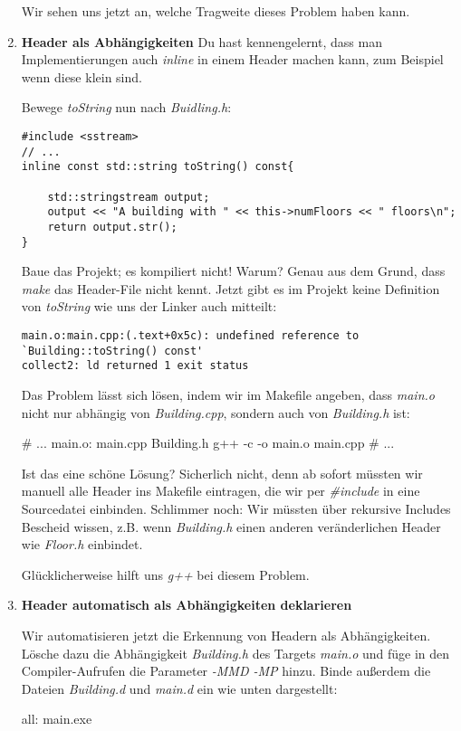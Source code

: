 \begin{enumerate}
Wir sehen uns jetzt an, welche Tragweite dieses Problem haben kann.


\item\textbf{Header als Abhängigkeiten}
Du hast kennengelernt, dass man Implementierungen auch \emph{inline} in einem Header machen kann, zum Beispiel wenn diese klein sind.

Bewege \emph{toString} nun nach \emph{Buidling.h}:
\begin{lstlisting}
#include <sstream>
// ...
inline const std::string toString() const{

    std::stringstream output;
    output << "A building with " << this->numFloors << " floors\n";
    return output.str();
}
\end{lstlisting}

Baue das Projekt; es kompiliert nicht! Warum? Genau aus dem Grund, dass \emph{make} das Header-File nicht \glqq kennt\grqq{}.
Jetzt gibt es im Projekt keine Definition von \emph{toString} wie uns der Linker auch mitteilt:
\begin{verbatim}
main.o:main.cpp:(.text+0x5c): undefined reference to `Building::toString() const'
collect2: ld returned 1 exit status
\end{verbatim}

Das Problem lässt sich lösen, indem wir im Makefile angeben, dass \emph{main.o} nicht nur abhängig von \emph{Building.cpp}, sondern auch von \emph{Building.h} ist:
\begin{lstmake}
# ...
main.o: main.cpp Building.h
	g++ -c -o main.o main.cpp
# ...
\end{lstmake}

Ist das eine schöne Lösung?
Sicherlich nicht, denn ab sofort müssten wir manuell alle Header ins Makefile eintragen, die wir per \emph{\#include} in eine Sourcedatei einbinden.
Schlimmer noch: Wir müssten über rekursive Includes Bescheid wissen, z.B. wenn \emph{Building.h} einen anderen veränderlichen Header wie \emph{Floor.h} einbindet.

Glücklicherweise hilft uns \emph{g++} bei diesem Problem.

\item\textbf{Header automatisch als Abhängigkeiten deklarieren}

Wir automatisieren jetzt die Erkennung von Headern als Abhängigkeiten.
Lösche dazu die Abhängigkeit \emph{Building.h} des Targets \emph{main.o} und füge in den Compiler-Aufrufen die Parameter \emph{-MMD -MP} hinzu.
Binde außerdem die Dateien \emph{Building.d} und \emph{main.d} ein wie unten dargestellt:
\begin{lstmake}
all: main.exe


\end{lstmake}
\end{enumerate}
